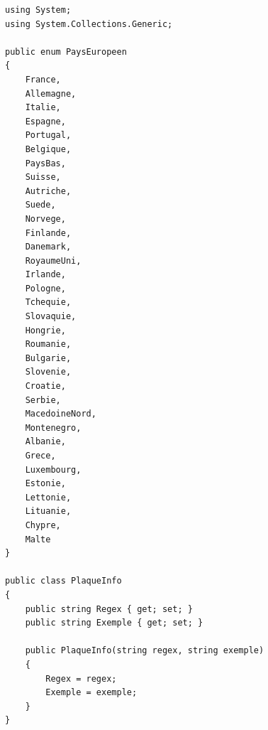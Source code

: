 \documentclass[main.tex]{subfiles}
\begin{document}
\begin{lstlisting}
using System;
using System.Collections.Generic;

public enum PaysEuropeen
{
    France,
    Allemagne,
    Italie,
    Espagne,
    Portugal,
    Belgique,
    PaysBas,
    Suisse,
    Autriche,
    Suede,
    Norvege,
    Finlande,
    Danemark,
    RoyaumeUni,
    Irlande,
    Pologne,
    Tchequie,
    Slovaquie,
    Hongrie,
    Roumanie,
    Bulgarie,
    Slovenie,
    Croatie,
    Serbie,
    MacedoineNord,
    Montenegro,
    Albanie,
    Grece,
    Luxembourg,
    Estonie,
    Lettonie,
    Lituanie,
    Chypre,
    Malte
}

public class PlaqueInfo
{
    public string Regex { get; set; }
    public string Exemple { get; set; }

    public PlaqueInfo(string regex, string exemple)
    {
        Regex = regex;
        Exemple = exemple;
    }
}


\end{lstlisting}
\end{document}
